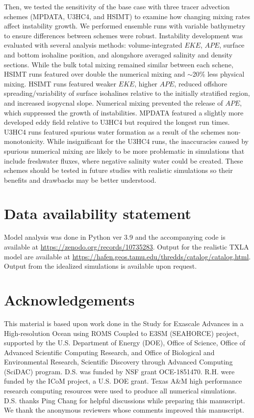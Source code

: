 Then, we tested the sensitivity of the base case with three tracer advection schemes (MPDATA, U3HC4, and HSIMT) to examine how changing mixing rates affect instability growth. We performed ensemble runs with variable bathymetry to ensure differences between schemes were robust. Instability development was evaluated with several analysis methods: volume-integrated $EKE$, $APE$, surface and bottom isohaline position, and alongshore averaged salinity and density sections. While the bulk total mixing remained similar between each schene, HSIMT runs featured over double the numerical mixing and $\sim$20\% less physical mixing. HSIMT runs featured weaker $EKE$, higher $APE$, reduced offshore spreading/variability of surface isohalines relative to the initially stratified region, and increased isopycnal slope. Numerical mixing prevented the release of $APE$, which suppressed the growth of instabilities. MPDATA featured a slightly more developed eddy field relative to U3HC4 but required the longest run times. U3HC4 runs featured spurious water formation as a result of the schemes non-monotonicity. While insignificant for the U3HC4 runs, the inaccuracies caused by spurious numerical mixing are likely to be more problematic in simulations that include freshwater fluxes, where negative salinity water could be created. These schemes should be tested in future studies with realistic simulations so their benefits and drawbacks may be better understood. 

\section*{Data availability statement}
Model analysis was done in Python ver 3.9 and the accompanying code is available at \url{https://zenodo.org/records/10735283}. Output for the realistic TXLA model are available at \url{https://hafen.geos.tamu.edu/thredds/catalog/catalog.html}. Output from the idealized simulations is available upon request.

\section*{Acknowledgements}
This material is based upon work done in the Study for Exascale Advances in a High-resolution Ocean using ROMS Coupled to E3SM (SEAHORCE) project, supported by the U.S. Department of Energy (DOE), Office of Science, Office of Advanced Scientific Computing Research, and Office of Biological and Environmental Research, Scientific Discovery through Advanced Computing (SciDAC) program. D.S. was funded by NSF grant OCE-1851470. R.H. were funded by the ICoM project, a U.S. DOE grant. Texas A\&M high performance research computing resources were used to produce all numerical simulations. D.S. thanks Ping Chang for helpful discussions while preparing this manuscript. We thank the anonymous reviewers whose comments improved this manuscript. 

